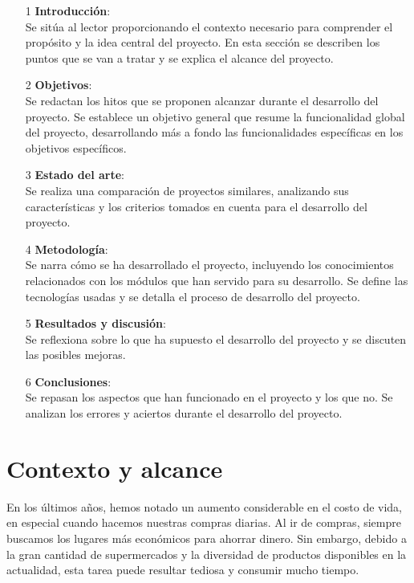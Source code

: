 \documentclass[12pt,twoside,titlepage]{report}
\begin{document}
\begin{itemize}
\item[1] \textbf{Introducción}: \\ Se sitúa al lector proporcionando el contexto necesario para comprender el propósito y la idea central del proyecto. En esta sección se describen los puntos que se van a tratar y se explica el alcance del proyecto.

\item[2] \textbf{Objetivos}: \\ Se redactan los hitos que se proponen alcanzar durante el desarrollo del proyecto. Se establece un objetivo general que resume la funcionalidad global del proyecto, desarrollando más a fondo las funcionalidades específicas en los objetivos específicos.

\item[3] \textbf{Estado del arte}: \\ Se realiza una comparación de proyectos similares, analizando sus características y los criterios tomados en cuenta para el desarrollo del proyecto.

\item[4] \textbf{Metodología}: \\ Se narra cómo se ha desarrollado el proyecto, incluyendo los conocimientos relacionados con los módulos que han servido para su desarrollo. Se define las tecnologías usadas y se detalla el proceso de desarrollo del proyecto.

\item[5] \textbf{Resultados y discusión}: \\ Se reflexiona sobre lo que ha supuesto el desarrollo del proyecto y se discuten las posibles mejoras.

\item[6] \textbf{Conclusiones}: \\ Se repasan los aspectos que han funcionado en el proyecto y los que no. Se analizan los errores y aciertos durante el desarrollo del proyecto.
\end{itemize}

\section{Contexto y alcance}

En los últimos años, hemos notado un aumento considerable en el costo de vida, en especial cuando hacemos nuestras compras diarias. Al ir de compras, siempre buscamos los lugares más económicos para ahorrar dinero. Sin embargo, debido a la gran cantidad de supermercados y la diversidad de productos disponibles en la actualidad, esta tarea puede resultar tediosa y consumir mucho tiempo.
\end{document}
